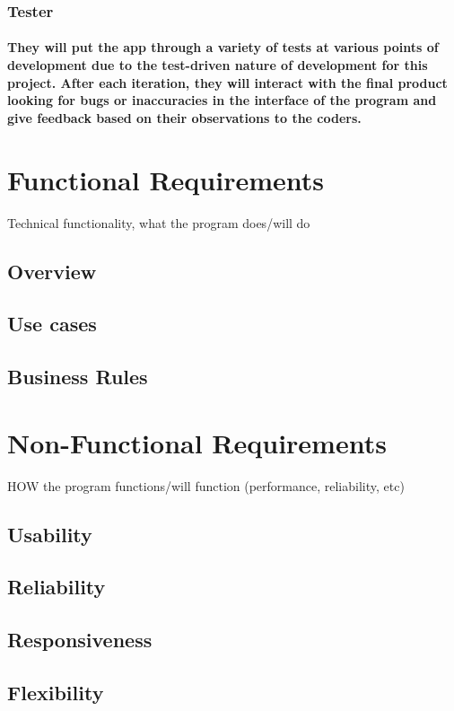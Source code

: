 \documentclass{article}
\begin{document}
\subsubsection{Tester}
\paragraph{\indent They will put the app through a variety of tests at various points of development due to the test-driven nature of development for this project. After each iteration, they will interact with the final product looking for bugs or inaccuracies in the interface of the program and give feedback based on their observations to the coders.}

\newpage
\section {Functional Requirements}
Technical functionality, what the program does/will do

\subsection{Overview}
\subsection{Use cases}
\subsection{Business Rules}

\newpage
\section {Non-Functional Requirements}
HOW the program functions/will function (performance, reliability, etc)

\subsection{Usability}
\subsection{Reliability}
\subsection{Responsiveness}
\subsection{Flexibility}
\end{document}
